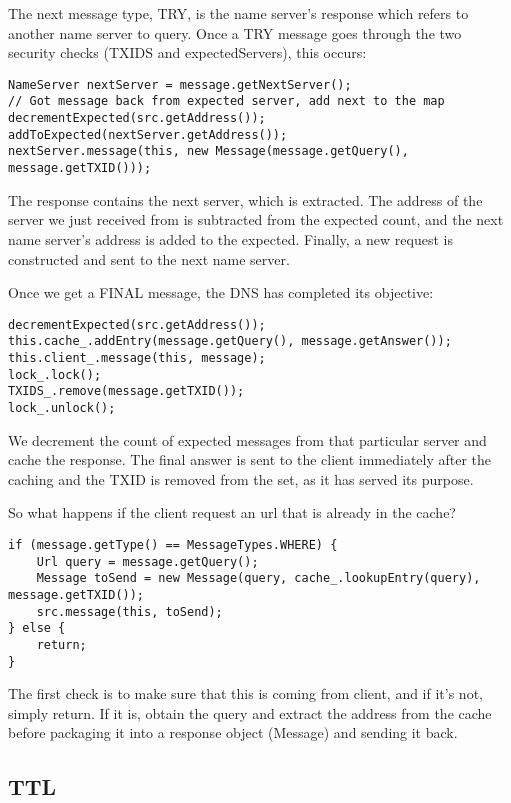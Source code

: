 \documentclass[a4paper, 12pt]{article} %
\begin{document}
The next message type, TRY, is the name server’s response which refers to another name server to query. Once a TRY message goes through the two security checks (TXIDS and expectedServers), this occurs: 

\begin{lstlisting}
NameServer nextServer = message.getNextServer();
// Got message back from expected server, add next to the map 
decrementExpected(src.getAddress());
addToExpected(nextServer.getAddress());
nextServer.message(this, new Message(message.getQuery(), message.getTXID()));
\end{lstlisting}

The response contains the next server, which is extracted. The address of the server we just received from is subtracted from the expected count, and the next name server’s address is added to the expected. Finally, a new request is constructed and sent to the next name server. 

Once we get a FINAL message, the DNS has completed its objective: 

\begin{lstlisting}
decrementExpected(src.getAddress());
this.cache_.addEntry(message.getQuery(), message.getAnswer());
this.client_.message(this, message);
lock_.lock();
TXIDS_.remove(message.getTXID());
lock_.unlock();	
\end{lstlisting}

We decrement the count of expected messages from that particular server and cache the response. The final answer is sent to the client immediately after the caching and the TXID is removed from the set, as it has served its purpose.

So what happens if the client request an url that is already in the cache?

\begin{lstlisting}
if (message.getType() == MessageTypes.WHERE) {
    Url query = message.getQuery();
    Message toSend = new Message(query, cache_.lookupEntry(query), message.getTXID());
    src.message(this, toSend);
} else {
    return;
}
\end{lstlisting}

The first check is to make sure that this is coming from  client, and if it’s not, simply return. If it is, obtain the query and extract the address from the cache before packaging it into a response object (Message) and sending it back.

\subsection*{TTL}
\end{document}
